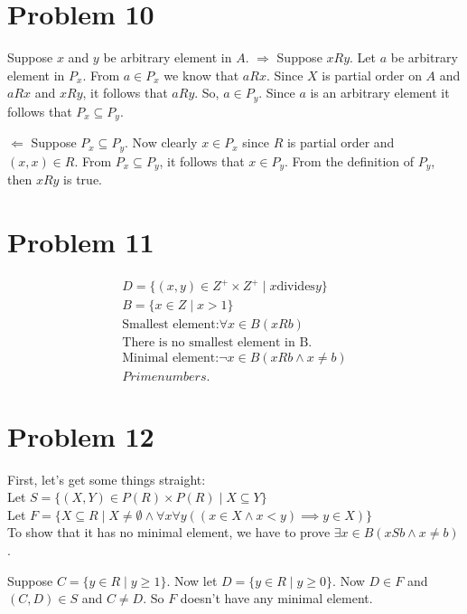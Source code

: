 \documentclass{article}
\begin{document}
\section{Problem 10}
Suppose $x$ and $y$ be arbitrary element in $A$.
$\Rightarrow$ Suppose $xRy$. Let $a$ be arbitrary element in $P_x$.
From $a \in P_x$ we know that $aRx$. Since $X$ is partial order on $A$
and $aRx$ and $xRy$, it follows that $aRy$. So, $a \in P_y$. Since $a$
is an arbitrary element it follows that $P_x \subseteq P_y$.

$\Leftarrow$ Suppose $P_x \subseteq P_y$. Now clearly $x \in P_x$
since $R$ is partial order and $(x,x) \in R$. From $P_x \subseteq
P_y$, it follows that $x \in P_y$. From the definition of $P_y$, then
$xRy$ is true.

\section{Problem 11}
\begin{align*}
  D = \{(x,y) \in Z^{+} \times Z^{+} \mid x \text{divides} y \} \\
  B = \{x \in Z \mid x > 1\} \\
  \text{Smallest element:} \forall x \in B(x R b) \\
  \text{There is no smallest element in B.} \\
  \text{Minimal element:} \neg x \in B(xRb \land x \neq b) \\
  Prime numbers.
\end{align*}

\section{Problem 12}
First, let's get some things straight: \\
Let $S = \{(X,Y) \in P(R) \times P(R) \mid X \subseteq Y\}$ \\
Let $F = \{X \subseteq R \mid X \neq \emptyset \land \forall x \forall
y ((x \in X \land x < y) \implies y \in X)\}$ \\

To show that it has no minimal element, we have to prove $\exists x
\in B(xSb \land x \neq b)$.

Suppose $C = \{y \in R \mid y \geq 1\}$. Now let $D = \{y \in R \mid y
\geq 0\}$. Now $D \in F$ and $(C,D) \in S$ and $C \neq D$. So $F$
doesn't have any minimal element.
\end{document}
